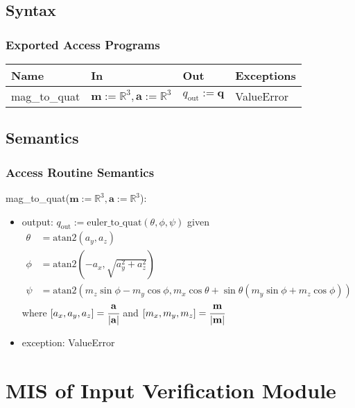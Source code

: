 \documentclass[12pt, titlepage]{article}
\begin{document}
\subsection{Syntax}

\subsubsection{Exported Access Programs}

\begin{center}
\begin{tabular}{p{3cm} p{4cm} p{3cm} p{2cm}}
\hline
\textbf{Name} & \textbf{In} & \textbf{Out} & \textbf{Exceptions} \\
\hline
mag\_to\_quat & $\mathbf{m}:=\mathbb{R}^3, \mathbf{a}:=\mathbb{R}^3$ & $q_\text{out} := \mathbf{q}$ & ValueError \\
\hline
\end{tabular}
\end{center}

\subsection{Semantics}

\subsubsection{Access Routine Semantics}

\noindent mag\_to\_quat($\mathbf{m}:=\mathbb{R}^3, \mathbf{a}:=\mathbb{R}^3$):
\begin{itemize}
\item output: $q_\text{out}:= \text{euler\_to\_quat}(\theta, \phi, \psi)$ given
\begin{align*}
  \theta &= \text{atan2}(a_y, a_z) \\
  \phi &= \text{atan2}(-a_x, \sqrt{a_y^2+a_z^2}) \\
  \psi &= \text{atan2}(m_z\sin\phi - m_y\cos\phi, m_x\cos\theta + \sin\theta(m_y\sin\phi + m_z\cos\phi))
\end{align*}
where $[a_x, a_y, a_z] = \cfrac{\mathbf{a}}{|\mathbf{a}|}$ and $[m_x, m_y, m_z] = \cfrac{\mathbf{m}}{|\mathbf{m}|}$
\item exception: ValueError
\end{itemize}

\newpage

\section{MIS of Input Verification Module} \label{ivm}
\end{document}
